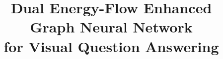 \documentclass[letterpaper]{article} %
\title{Dual Energy-Flow Enhanced Graph Neural Network\\ for Visual Question Answering}
\begin{document}
\maketitle

\begin{abstract}


\end{abstract}
\end{document}
